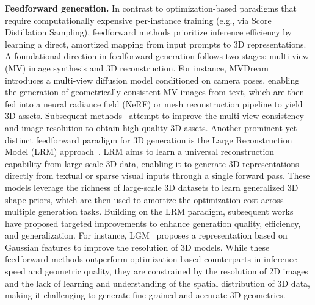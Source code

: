\documentclass{article} %
\begin{document}
{\bf Feedforward generation.} In contrast to optimization-based paradigms that require computationally expensive per-instance training (e.g., via Score Distillation Sampling), feedforward methods prioritize inference efficiency by learning a direct, amortized mapping from input prompts to 3D representations. A foundational direction in feedforward generation follows two stages: multi-view (MV) image synthesis and 3D reconstruction. For instance, MVDream~\cite{shimvdream} introduces a multi-view diffusion model conditioned on camera poses, enabling the generation of geometrically consistent MV images from text, which are then fed into a neural radiance field (NeRF) or mesh reconstruction pipeline to yield 3D assets. Subsequent methods~\cite{liu2023zero,long2024wonder3d,li2023instant3d,liu2023one,liu2023syncdreamer,li2024era3d} attempt to improve the multi-view consistency and image resolution to obtain high-quality 3D assets. Another prominent yet distinct feedforward paradigm for 3D generation is the Large Reconstruction Model (LRM) approach~\cite{hong2023lrm}. LRM aims to learn a universal reconstruction capability from large-scale 3D data, enabling it to generate 3D representations directly from textual or sparse visual inputs through a single forward pass. These models leverage the richness of large-scale 3D datasets to learn generalized 3D shape priors, which are then used to amortize the optimization cost across multiple generation tasks. Building on the LRM paradigm, subsequent works~\cite{wang2023pf,tang2024lgm,xu2024instantmesh,li2023instant3d} have proposed targeted improvements to enhance generation quality, efficiency, and generalization. For instance, LGM~\cite{tang2024lgm} proposes a representation based on Gaussian features to improve the resolution of 3D models. While these feedforward methods outperform optimization-based counterparts in inference speed and geometric quality, they are constrained by the resolution of 2D images and the lack of learning and understanding of the spatial distribution of 3D data, making it challenging to generate fine-grained and accurate 3D geometries.
\end{document}

